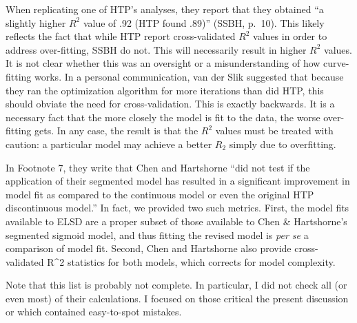 \begin{appendix}
When replicating one of HTP's analyses, they report that they obtained
``a slightly higher \(R^2\) value of .92 (HTP found .89)'' (SSBH,
p.~10). This likely reflects the fact that while HTP report
cross-validated \(R^2\) values in order to address over-fitting, SSBH do
not. This will necessarily result in higher \(R^2\) values. It is not
clear whether this was an oversight or a misunderstanding of how
curve-fitting works. In a personal communication, van der Slik suggested
that because they ran the optimization algorithm for more iterations
than did HTP, this should obviate the need for cross-validation. This is
exactly backwards. It is a necessary fact that the more closely the
model is fit to the data, the worse over-fitting gets. In any case, the
result is that the \(R^2\) values must be treated with caution: a
particular model may achieve a better \(R_2\) simply due to overfitting.

In Footnote 7, they write that Chen and Hartshorne ``did not test if the
application of their segmented model has resulted in a significant
improvement in model fit as compared to the continuous model or even the
original HTP discontinuous model.'' In fact, we provided two such
metrics. First, the model fits available to ELSD are a proper subset of
those available to Chen \& Hartshorne's segmented sigmoid model, and
thus fitting the revised model is \emph{per se} a comparison of model
fit. Second, Chen and Hartshorne also provide cross-validated R\^{}2
statistics for both models, which corrects for model complexity.

Note that this list is probably not complete. In particular, I did not
check all (or even most) of their calculations. I focused on those
critical the present discussion or which contained easy-to-spot
mistakes.
\end{appendix}
